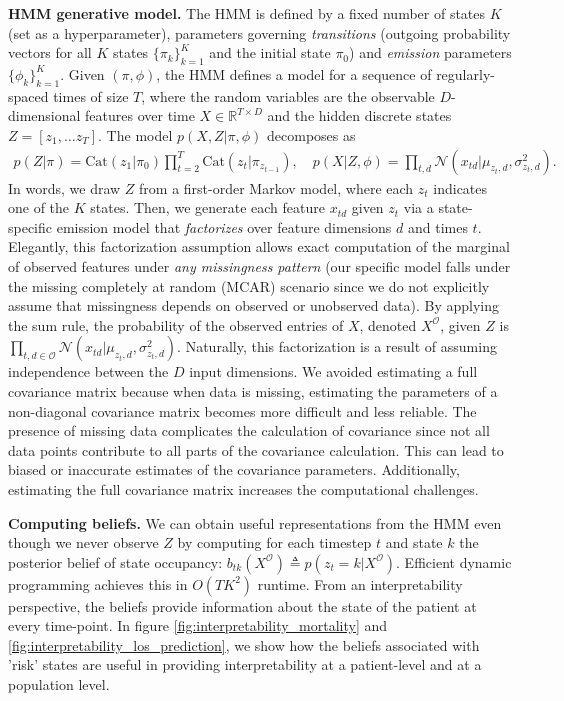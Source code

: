 \textbf{HMM generative model.}
The HMM is defined by a fixed number of states $K$ (set as a hyperparameter), parameters governing \emph{transitions} (outgoing probability vectors for all $K$ states $\{ \pi_k \}_{k=1}^K$ and the initial state $\pi_0$) and \emph{emission} parameters $\{ \phi_k \}_{k=1}^K$.
Given $(\pi, \phi)$, the HMM defines a model for a sequence of regularly-spaced times of size $T$, where the random variables are the observable $D$-dimensional features over time $X \in \mathbb{R}^{T \times D}$ and the hidden discrete states $Z = [z_1, \ldots z_T]$.
The model
$p( X, Z | \pi, \phi)$ decomposes as
\begin{align}
	p( Z | \pi) = \text{Cat}( z_1 | \pi_0)
	\textstyle \prod_{t=2}^T \text{Cat}( z_t | \pi_{z_{t-1}} ),
	\quad 
	p( X | Z, \phi) = \textstyle \prod_{t,d} \mathcal{N}( x_{td} | \mu_{z_t,d}, \sigma_{z_t,d}^2 ).
\end{align}
In words, we draw $Z$ from a first-order Markov model, where each $z_t$ indicates one of the $K$ states.
Then, we generate each feature $x_{td}$ given $z_t$ via a state-specific emission model that \emph{factorizes} over feature dimensions $d$ and times $t$.
Elegantly, this factorization assumption allows exact computation of the marginal of observed features under \emph{any missingness pattern} (our specific model falls under the missing completely at random (MCAR) scenario since we do not explicitly assume that missingness depends on observed or unobserved data).
By applying the sum rule, the probability of the observed entries of $X$, denoted $X^{\mathcal{O}}$, given $Z$ is $\prod_{t,d \in \mathcal{O}} \mathcal{N}( x_{td} | \mu_{z_t,d}, \sigma_{z_t,d}^2 )$. Naturally, this factorization is a result of assuming independence between the $D$ input dimensions. We avoided estimating a full covariance matrix because when data is missing, estimating the parameters of a non-diagonal covariance matrix becomes more difficult and less reliable. The presence of missing data complicates the calculation of covariance since not all data points contribute to all parts of the covariance calculation. This can lead to biased or inaccurate estimates of the covariance parameters. Additionally, estimating the full covariance matrix increases the computational challenges.

\textbf{Computing beliefs.}
We can obtain useful representations from the HMM even though we never observe $Z$ by computing for each timestep $t$ and state $k$ the posterior belief of state occupancy: $b_{tk}(X^{\mathcal{O}} ) \triangleq p( z_t = k | X^{\mathcal{O}} )$.
Efficient dynamic programming achieves this in $O(TK^2)$ runtime. From an interpretability perspective, the beliefs provide information about the state of the patient at every time-point. In figure \ref{fig:interpretability_mortality} and \ref{fig:interpretability_los_prediction}, we show how the beliefs associated with 'risk' states are useful in providing interpretability at a patient-level and at a population level.


